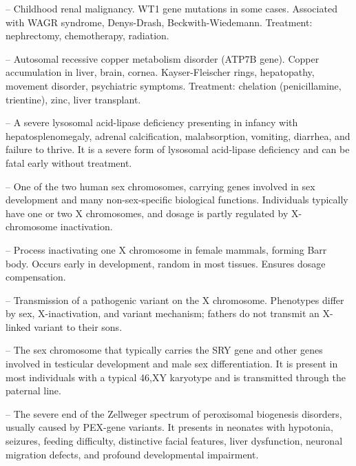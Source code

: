-- Childhood renal malignancy. WT1 gene mutations in some cases. Associated with WAGR syndrome, Denys-Drash, Beckwith-Wiedemann. Treatment: nephrectomy, chemotherapy, radiation.

-- Autosomal recessive copper metabolism disorder (ATP7B gene). Copper accumulation in liver, brain, cornea. Kayser-Fleischer rings, hepatopathy, movement disorder, psychiatric symptoms. Treatment: chelation (penicillamine, trientine), zinc, liver transplant.

-- A severe lysosomal acid-lipase deficiency presenting in infancy with hepatosplenomegaly, adrenal calcification, malabsorption, vomiting, diarrhea, and failure to thrive. It is a severe form of lysosomal acid-lipase deficiency and can be fatal early without treatment.

-- One of the two human sex chromosomes, carrying genes involved in sex development and many non-sex-specific biological functions. Individuals typically have one or two X chromosomes, and dosage is partly regulated by X-chromosome inactivation.

-- Process inactivating one X chromosome in female mammals, forming Barr body. Occurs early in development, random in most tissues. Ensures dosage compensation.

-- Transmission of a pathogenic variant on the X chromosome. Phenotypes differ by sex, X-inactivation, and variant mechanism; fathers do not transmit an X-linked variant to their sons.

-- The sex chromosome that typically carries the SRY gene and other genes involved in testicular development and male sex differentiation. It is present in most individuals with a typical 46,XY karyotype and is transmitted through the paternal line.

-- The severe end of the Zellweger spectrum of peroxisomal biogenesis disorders, usually caused by PEX-gene variants. It presents in neonates with hypotonia, seizures, feeding difficulty, distinctive facial features, liver dysfunction, neuronal migration defects, and profound developmental impairment.
